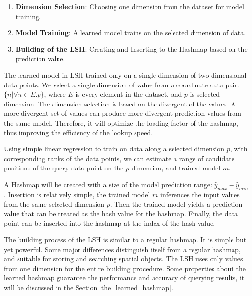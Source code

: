 \begin{enumerate}
    \item \textbf{Dimension Selection}: Choosing one dimension from the dataset for model training.
    \item \textbf{Model Training}: A learned model trains on the selected dimension of data. 
    \item \textbf{Building of the LSH}: Creating and Inserting to the Hashmap based on the prediction value.
\end{enumerate}

The learned model in LSH trained only on a single dimension of two-dimensional data points. We select a single dimension of value from a coordinate data pair: $\{n|\forall n \in E.p\}$, where $E$ is every element in the dataset, and $p$ is selected dimension. The dimension selection is based on the  divergent of the values. A more divergent set of values can produce more divergent prediction values  from the same model. Therefore, it will optimize the loading factor of the hashmap, thus improving the efficiency of the lookup speed.

Using simple linear regression to train on data along a selected dimension $p$, with corresponding ranks of the data points, we can estimate a range of candidate positions of the query data point on the $p$ dimension, and trained model $m$. 

A Hashmap will be created with a size of the model prediction range: $\hat{y}_{max} - \hat{y}_{min}$. Insertion is relatively simple, the trained model $m$ inferences the input values from the same selected dimension $p$. Then the trained model yields a prediction value that can be treated as the hash value for the hashmap. Finally, the data point can be inserted into the hashmap at the index of the hash value. 

The building process of the LSH is similar to a regular hashmap. It is simple but yet powerful. Some major differences distinguish itself from a regular hashmap, and suitable for storing and searching spatial objects. The LSH uses only values from one dimension for the entire building procedure. Some properties about the learned hashmap guarantee the performance and accuracy of querying results, it will be discussed in the Section \ref{the_learned_hashmap}. 



